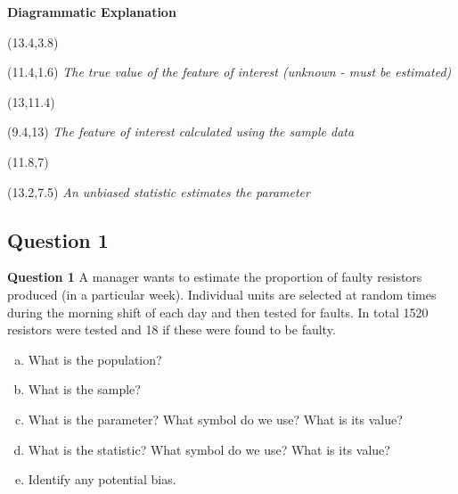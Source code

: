 \documentclass[compress]{beamer}        %
\makeatletter
\newcommand{\tcb}{\textcolor{beamer@blendedblue}}
\makeatother
\begin{document}
\begin{frame}{\bf \tcb{Diagrammatic Explanation}}
\begin{textblock}{1}(13.4,3.8)
\xymatrixrowsep{1.3cm}
\end{textblock}
\begin{textblock}{4}(11.4,1.6)
{\footnotesize\emph{The true value of the feature of interest (unknown - must be estimated)}}
\end{textblock}

\begin{textblock}{1}(13,11.4)
\xymatrixrowsep{1.2cm}
\end{textblock}
\begin{textblock}{4.5}(9.4,13)
{\footnotesize\emph{The feature of interest calculated using the sample data}}
\end{textblock}

\begin{textblock}{1}(11.8,7)
\xymatrixcolsep{0.7cm}
\end{textblock}
\begin{textblock}{3}(13.2,7.5)
{\footnotesize\emph{An unbiased statistic estimates the parameter}}
\end{textblock}
\end{frame}


\subsection{Question 1}
\begin{frame}{\bf \tcb{Question 1}}
A manager wants to estimate the proportion of faulty resistors produced (in a particular week). Individual units are selected at random times during the morning shift of each day and then tested for faults. In total 1520 resistors were tested and 18 if these were found to be faulty.\\[0.4cm]
\begin{enumerate}[a)]
\item What is the population?
\item What is the sample?
\item What is the parameter? What symbol do we use? What is its value?
\item What is the statistic? What symbol do we use? What is its value?
\item Identify any potential bias.
\end{enumerate}
\end{frame}
\end{document}
